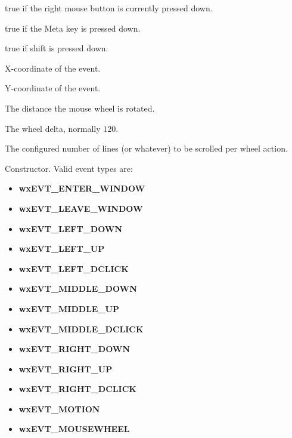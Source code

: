 true if the right mouse button is currently pressed down.


\label{wxmouseeventmmetadown}


true if the Meta key is pressed down.


\label{wxmouseeventmshiftdown}


true if shift is pressed down.


\label{wxmouseeventmx}


X-coordinate of the event.


\label{wxmouseeventmy}


Y-coordinate of the event.


\label{wxmouseeventmwheelrotation}


The distance the mouse wheel is rotated.


\label{wxmouseeventmwheeldelta}


The wheel delta, normally $120$.


\label{wxmouseeventmlinesperaction}


The configured number of lines (or whatever) to be scrolled per wheel
action.



\label{wxmouseeventctor}


Constructor. Valid event types are:

\begin{itemize}
\itemsep=0pt
\item {\bf wxEVT\_ENTER\_WINDOW}
\item {\bf wxEVT\_LEAVE\_WINDOW}
\item {\bf wxEVT\_LEFT\_DOWN}
\item {\bf wxEVT\_LEFT\_UP}
\item {\bf wxEVT\_LEFT\_DCLICK}
\item {\bf wxEVT\_MIDDLE\_DOWN}
\item {\bf wxEVT\_MIDDLE\_UP}
\item {\bf wxEVT\_MIDDLE\_DCLICK}
\item {\bf wxEVT\_RIGHT\_DOWN}
\item {\bf wxEVT\_RIGHT\_UP}
\item {\bf wxEVT\_RIGHT\_DCLICK}
\item {\bf wxEVT\_MOTION}
\item {\bf wxEVT\_MOUSEWHEEL}
\end{itemize}



